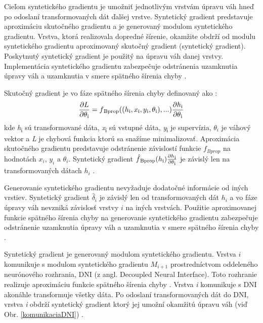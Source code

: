Cieľom syntetického gradientu je umožniť jednotlivým vrstvám úpravu váh hneď po odoslaní transformovaných dát ďalšej vrstve. Syntetický gradient predstavuje aproximáciu skutočného gradientu a je generovaný modulom syntetického gradientu. Vrstva, ktorá realizovala dopredné šírenie, okamžite obdrží od modulu syntetického gradientu aproximovaný skutočný gradient (syntetický gradient). Poskytnutý syntetický gradient je použitý na úpravu váh danej vrstvy. Implementácia syntetického gradientu zabezpečuje odstránenia uzamknutia úpravy váh a uzamknutia v smere spätného šírenia chyby \cite{Jaderberg2016}. 

Skutočný gradient je vo fáze spätného šírenia chyby definovaný ako \cite{Goh1995, Jaderberg2016}:
\begin{equation}
    \frac{\partial L}{\partial \theta \textsubscript{i}} = f\textsubscript{Bprop}((h\textsubscript{i},x\textsubscript{i},y\textsubscript{i},\theta\textsubscript{i}),...)\frac{\partial h\textsubscript{i}}{\partial \theta \textsubscript{i}}
\end{equation}
kde \textit{h}\textsubscript{i} sú transformované dáta, \textit{x}\textsubscript{i} sú vstupné dáta, \textit{y}\textsubscript{i} je supervízia, $\theta_i$ je váhový vektor a \textit{L} je chybová funkcia ktorú sa snažíme minimalizovať. Aproximácia skutočného gradientu predstavuje odstránenie závislostí funkcie $f_{Bprop}$ na hodnotách $x_i$, $y_i$ a $\theta_i$. Syntetický gradient $\hat{f}\textsubscript{Bprop}(h\textsubscript{i})\frac{\partial h\textsubscript{i}}{\partial \theta \textsubscript{i}} $
je závislý len na transformovaných dátach $h_i$ \cite{Jaderberg2016}.  

Generovanie syntetického gradientu nevyžaduje dodatočné informácie od iných vrstiev. Syntetický gradient $\hat{\delta}_i$ je závislý len od transformovaných dát $h_i$ a vo fáze úpravy váh nevzniká závislosť vrstvy $i$ na iných vrstvách. Použitie aproximovanej funkcie spätného šírenia chyby na generovanie syntetického gradientu zabezpečuje odstránenie uzamknutia úpravy váh a uzamknutia v smere spätného šírenia chyby \cite{Jaderberg2016}.

Syntetický gradient je generovaný modulom syntetického gradientu. Vrstva $i$ komunikuje s modulom syntetického gradientu $M_{i+1}$ prostredníctvom oddeleného neurónového rozhrania, DNI (z angl. Decoupled Neural Interface). Toto rozhranie realizuje aproximáciu funkcie spätného šírenia chyby \cite{Czarnecki2017}. Vrstva \textit{i} komunikuje s DNI akonáhle transformuje všetky dáta. Po odoslaní transformovaných dát do DNI, vrstva \textit{i} obdrží syntetický gradient ktorý jej umožní okamžitú úpravu váh (viď Obr. \ref{komunikaciaDNI}) \cite{Jaderberg2016}.

